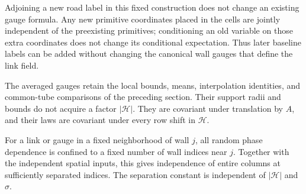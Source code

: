 Adjoining a new road label in this fixed construction does not change
an existing gauge formula. Any new primitive coordinates placed in the
cells are jointly independent of the preexisting primitives;
conditioning an old variable on those extra coordinates
does not change its conditional expectation. Thus later baseline labels
can be added without changing the canonical wall gauges that define
the link field.

\begin{lemma}\label{phases:locality}
The averaged gauges retain the local bounds, means, interpolation
identities, and common-tube comparisons of the preceding section.
Their support radii and bounds do not acquire a factor
$|\mathcal H|$.  They are covariant under translation by $A$, and their
laws are covariant under every row shift in $\mathcal H$.

For a link or gauge in a fixed neighborhood of wall $j$, all random phase
dependence is confined to a fixed number of wall indices near $j$.
Together with the independent spatial inputs, this gives independence
of entire columns at sufficiently separated indices.  The separation
constant is independent of $|\mathcal H|$ and $\sigma$.
\end{lemma}

